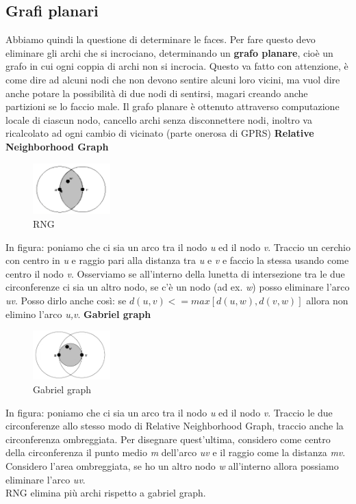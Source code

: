 \documentclass[12pt,italian]{report}
\begin{document}
\subsection{Grafi planari}
Abbiamo quindi la questione di determinare le faces. Per fare questo devo eliminare gli archi che si incrociano, determinando un \textbf{grafo planare}, cioè un grafo in cui ogni coppia di archi non si incrocia. Questo va fatto con attenzione, è come dire ad alcuni nodi che non devono sentire alcuni loro vicini, ma vuol dire anche potare la possibilità di due nodi di sentirsi, magari creando anche partizioni se lo faccio male. Il grafo planare è ottenuto attraverso computazione locale di ciascun nodo, cancello archi senza disconnettere nodi, inoltro va ricalcolato ad ogni cambio di vicinato (parte onerosa di GPRS)
\bigbreak
\noindent \textbf{Relative Neighborhood Graph}
\begin{figure}[h]
\centering
\includegraphics[width=30mm]{img/RNG.PNG}
\caption{RNG}
\label{fig:fffeg}
\end{figure}
\bigbreak
\noindent In figura: poniamo che ci sia un arco tra il nodo \textit{u} ed il nodo \textit{v}. Traccio un cerchio con centro in \textit{u} e raggio pari alla distanza tra \textit{u} e \textit{v} e faccio la stessa usando come centro il nodo \textit{v}. Osserviamo se all'interno della lunetta di intersezione tra le due circonferenze ci sia un altro nodo, se c'è un nodo (ad ex. \textit{w}) posso eliminare l'arco \textit{uv}. Posso dirlo anche così: se $d(u,v) <= max[d(u,w), d(v,w)]$ allora non elimino l'arco \textit{u,v}.
\bigbreak
\noindent \textbf{Gabriel graph}
\begin{figure}[h]
\centering
\includegraphics[width=30mm]{img/gabriel.PNG}
\caption{Gabriel graph}
\label{fig:ffbeg}
\end{figure}
\bigbreak
\noindent In figura: poniamo che ci sia un arco tra il nodo \textit{u} ed il nodo \textit{v}. Traccio le due circonferenze allo stesso modo di Relative Neighborhood Graph, traccio anche la circonferenza ombreggiata. Per disegnare quest'ultima, considero come centro della circonferenza il punto medio \textit{m} dell'arco \textit{uv} e il raggio come la distanza \textit{mv}. Considero l'area ombreggiata, se ho un altro nodo \textit{w} all'interno allora possiamo eliminare l'arco \textit{uv}. \\
RNG elimina più archi rispetto a gabriel graph. 
\end{document}
